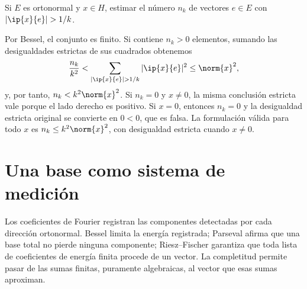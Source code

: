 \begin{ejercicio}
Si $E$ es ortonormal y $x\in H$, estimar el número $n_k$ de vectores $e\in E$ con $|\ip{x}{e}|>1/k$.
\end{ejercicio}
\begin{solucion}
Por Bessel, el conjunto es finito. Si contiene $n_k>0$ elementos, sumando las desigualdades estrictas de sus cuadrados obtenemos
\[
 \frac{n_k}{k^2}<\sum_{|\ip{x}{e}|>1/k}|\ip{x}{e}|^{2}\leq\norm{x}^{2},
\]
y, por tanto, $n_k<k^2\norm{x}^{2}$. Si $n_k=0$ y $x\ne0$, la misma conclusión estricta vale porque el lado derecho es positivo. Si $x=0$, entonces $n_k=0$ y la desigualdad estricta original se convierte en $0<0$, que es falsa. La formulación válida para todo $x$ es $n_k\leq k^2\norm{x}^{2}$, con desigualdad estricta cuando $x\ne0$.
\end{solucion}

\section{Una base como sistema de medición}
Los coeficientes de Fourier registran las componentes detectadas por cada dirección ortonormal. Bessel limita la energía registrada; Parseval afirma que una base total no pierde ninguna componente; Riesz--Fischer garantiza que toda lista de coeficientes de energía finita procede de un vector. La completitud permite pasar de las sumas finitas, puramente algebraicas, al vector que esas sumas aproximan.
